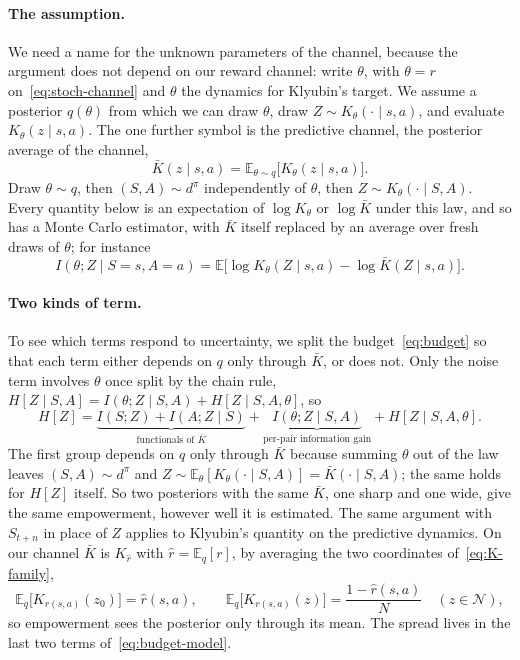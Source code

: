 \documentclass[11pt]{article}
\theoremstyle{remark}
\newcommand{\Ncal}{\mathcal N}
\newcommand{\E}{\mathbb E}
\newcommand{\1}{\mathds{1}}
\newcommand{\occ}{d^{\pi}}
\newcommand{\Hf}[1]{H\!\left[#1\right]}
\begin{document}
\paragraph{The assumption.}
We need a name for the unknown parameters of the channel, because the argument does not depend on our reward channel: write $\theta$, with $\theta=r$ on~\eqref{eq:stoch-channel} and $\theta$ the dynamics for Klyubin's target.
We assume a posterior $q(\theta)$ from which we can draw $\theta$, draw $Z\sim K_\theta(\cdot\mid s,a)$, and evaluate $K_\theta(z\mid s,a)$.
The one further symbol is the predictive channel, the posterior average of the channel,
\begin{equation}
  \bar K(z\mid s,a)=\E_{\theta\sim q}\big[K_\theta(z\mid s,a)\big].
  \label{eq:predictive-channel}
\end{equation}
Draw $\theta\sim q$, then $(S,A)\sim\occ$ independently of $\theta$, then $Z\sim K_\theta(\cdot\mid S,A)$.
Every quantity below is an expectation of $\log K_\theta$ or $\log\bar K$ under this law, and so has a Monte Carlo estimator, with $\bar K$ itself replaced by an average over fresh draws of $\theta$; for instance
\begin{equation}
  I(\theta;Z\mid S=s,A=a)=\E\big[\log K_\theta(Z\mid s,a)-\log\bar K(Z\mid s,a)\big].
  \label{eq:bald}
\end{equation}

\paragraph{Two kinds of term.}
To see which terms respond to uncertainty, we split the budget~\eqref{eq:budget} so that each term either depends on $q$ only through $\bar K$, or does not.
Only the noise term involves $\theta$ once split by the chain rule, $\Hf{Z\mid S,A}=I(\theta;Z\mid S,A)+\Hf{Z\mid S,A,\theta}$, so
\begin{equation}
  \Hf{Z}
  =\underbrace{I(S;Z)+I(A;Z\mid S)}_{\text{functionals of }\bar K}
  +\underbrace{I(\theta;Z\mid S,A)}_{\text{per-pair information gain}}
  +\Hf{Z\mid S,A,\theta}.
  \label{eq:budget-model}
\end{equation}
The first group depends on $q$ only through $\bar K$ because summing $\theta$ out of the law leaves $(S,A)\sim\occ$ and $Z\sim\E_\theta[K_\theta(\cdot\mid S,A)]=\bar K(\cdot\mid S,A)$; the same holds for $\Hf{Z}$ itself.
So two posteriors with the same $\bar K$, one sharp and one wide, give the same empowerment, however well it is estimated.
The same argument with $S_{t+n}$ in place of $Z$ applies to Klyubin's quantity on the predictive dynamics.
On our channel $\bar K$ is $K_{\hat r}$ with $\hat r=\E_q[r]$, by averaging the two coordinates of~\eqref{eq:K-family},
\begin{equation}
  \E_q\big[K_{r(s,a)}(z_0)\big]=\hat r(s,a),
  \qquad
  \E_q\big[K_{r(s,a)}(z)\big]=\frac{1-\hat r(s,a)}{N}\quad(z\in\Ncal),
\end{equation}
so empowerment sees the posterior only through its mean.
The spread lives in the last two terms of~\eqref{eq:budget-model}.
\end{document}
